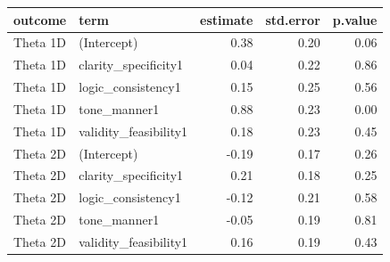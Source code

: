 \begin{tabular}{llrrr}
  \toprule
outcome & term & estimate & std.error & p.value \\ 
  \midrule
Theta 1D & (Intercept) & 0.38 & 0.20 & 0.06 \\ 
  Theta 1D & clarity\_specificity1 & 0.04 & 0.22 & 0.86 \\ 
  Theta 1D & logic\_consistency1 & 0.15 & 0.25 & 0.56 \\ 
  Theta 1D & tone\_manner1 & 0.88 & 0.23 & 0.00 \\ 
  Theta 1D & validity\_feasibility1 & 0.18 & 0.23 & 0.45 \\ 
  Theta 2D & (Intercept) & -0.19 & 0.17 & 0.26 \\ 
  Theta 2D & clarity\_specificity1 & 0.21 & 0.18 & 0.25 \\ 
  Theta 2D & logic\_consistency1 & -0.12 & 0.21 & 0.58 \\ 
  Theta 2D & tone\_manner1 & -0.05 & 0.19 & 0.81 \\ 
  Theta 2D & validity\_feasibility1 & 0.16 & 0.19 & 0.43 \\ 
   \bottomrule
\end{tabular}
